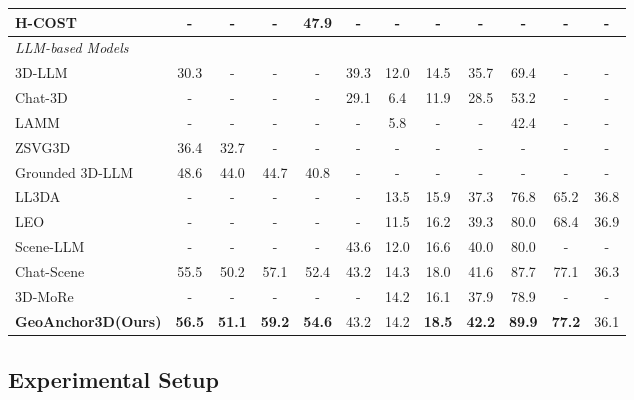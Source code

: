 \documentclass[lettersize,journal]{IEEEtran}
\begin{document}
\begin{table}[tbp]
{\begin{tabularx}{\textwidth}{@{}X *{11}{c}@{}}
H-COST~\cite{H-COST2025}
& - & - & - & 47.9 & - & - & - & - & - & - & - \\

\midrule
\textit{LLM-based Models} \\

3D-LLM~\cite{3dllm2023}
& 30.3 & - & - & - & 39.3 & 12.0 & 14.5 & 35.7 & 69.4 & - & - \\

Chat-3D~\cite{chat3d2023}
& - & - & - & - & 29.1 & 6.4 & 11.9 & 28.5 & 53.2 & - & - \\

LAMM~\cite{lamm2023}
& - & - & - & - & - & 5.8 & - & - & 42.4 & - & - \\

ZSVG3D~\cite{zsvg3d2024}
& 36.4 & 32.7 & - & - & - & - & - & - & - & - & - \\

Grounded 3D-LLM~\cite{grounded3dllm2024}
& 48.6 & 44.0 & 44.7 & 40.8 & - & - & - & - & - & - & - \\

LL3DA~\cite{ll3da2024}
& - & - & - & - & - & 13.5 & 15.9 & 37.3 & 76.8 & 65.2 & 36.8 \\

LEO~\cite{leo2024}
& - & - & - & - & - & 11.5 & 16.2 & 39.3 & 80.0 & 68.4 & 36.9 \\

Scene-LLM~\cite{scenellm2024}
& - & - & - & - & 43.6 & 12.0 & 16.6 & 40.0 & 80.0 & - & - \\

Chat-Scene~\cite{chatscene2024}
& 55.5 & 50.2 & 57.1 & 52.4 & 43.2 & 14.3 & 18.0 & 41.6 & 87.7 & 77.1 & 36.3 \\

3D-MoRe~\cite{3D-MoRe2025}
& - & - & - & - & - & 14.2 & 16.1 & 37.9 & 78.9 & - & - \\

\textbf{GeoAnchor3D(Ours)} 
& \textbf{56.5} & \textbf{51.1} 
& \textbf{59.2} & \textbf{54.6} 
& 43.2 & 14.2 & \textbf{18.5} & \textbf{42.2} & \textbf{89.9} 
& \textbf{77.2} & 36.1 \\

\bottomrule
\end{tabularx}
}
\end{table}

\subsection{Experimental Setup}
\end{document}
